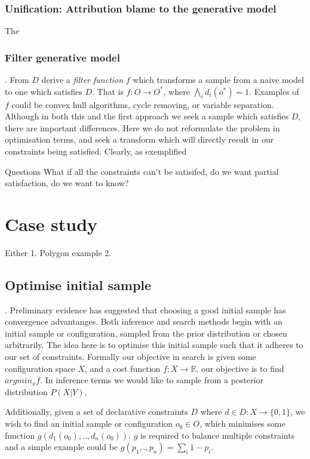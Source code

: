 \subsection{Unification: Attribution blame to the generative model}
The

\subsection*{Filter generative model}.  From $D$ derive a {\em filter function} $f$ which transforms a sample from a naive model to one which satisfies $D$.
That is $f:O \rightarrow O^*$, where $ \bigwedge\limits_{i} d_i(o^*) = 1$.
Examples of $f$ could be convex hull algorithms, cycle removing, or variable separation.
Although in both this and the first approach we seek a sample which satisfies $D$, there are important differences.
Here we do not reformulate the problem in optimisation terms, and seek a transform which will directly result in our constraints being satisfied.
Clearly, as exemplified 

Questions
What if all the constraints can't be satisifed, do we want partial satisfaction, do we want to know?

\chapter{Case study}
Either
1. Polygon example
2. 
\section{Optimise initial sample}.  Preliminary evidence has suggested that choosing a good initial sample has convergence advantanges.
Both inference and search methods begin with an initial sample or configuration, sampled from the prior distribution or chosen arbitrarily.
The idea here is to optimise this initial sample such that it adheres to our set of constraints.
Formally our objective in search is given some configuration space $X$, and a cost function $f:X \rightarrow \mathbb{R}$, our objective is to find $argmin_x f$.
In inference terms we would like to sample from a posterior distribution $P(X \vert Y)$.

Additionally, given a set of declarative constraints $D$ where $d \in D:X \rightarrow \{0,1\}$, we wish to find an initial sample or configuration $o_0 \in O$, which minimises some function $g(d_1(o_0),..,d_n(o_0))$.  $g$ is required to balance multiple constraints and a simple example could be $g(p_1,.,p_n) = \sum_i{1 - p_i}$.



